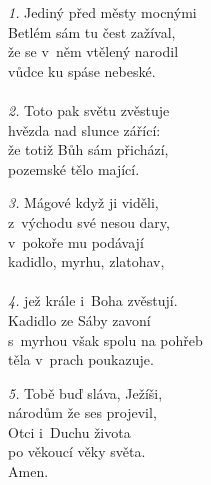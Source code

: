 \begin{translatioMulticol}{3}
{\color{red}\textit{1.}} Jediný před městy mocnými\\
Betlém sám tu čest zažíval,\\
že se v~něm vtělený narodil\\
vůdce ku spáse nebeské.\\
\\
{\color{red}\textit{2.}} Toto pak světu zvěstuje\\
hvězda nad slunce zářící:\\
že totiž Bůh sám přichází,\\
pozemské tělo mající.\columnbreak

{\color{red}\textit{3.}} Mágové když ji viděli,\\
z~východu své nesou dary,\\
v~pokoře mu podávají\\
kadidlo, myrhu, zlatohav,\\
\\
{\color{red}\textit{4.}} jež krále i~Boha zvěstují.\\
Kadidlo ze Sáby zavoní\\
s~myrhou však spolu na pohřeb\\
těla v~prach poukazuje.\columnbreak

{\color{red}\textit{5.}} Tobě buď sláva, Ježíši,\\
národům že ses projevil,\\
Otci i~Duchu života\\
po věkoucí věky světa.\\
Amen.
\end{translatioMulticol}
